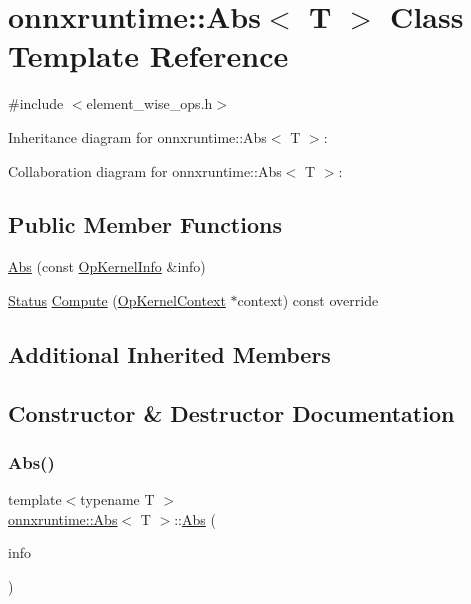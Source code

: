 \hypertarget{classonnxruntime_1_1Abs}{}\section{onnxruntime\+:\+:Abs$<$ T $>$ Class Template Reference}
\label{classonnxruntime_1_1Abs}


{\ttfamily \#include $<$element\+\_\+wise\+\_\+ops.\+h$>$}



Inheritance diagram for onnxruntime\+:\+:Abs$<$ T $>$\+:


Collaboration diagram for onnxruntime\+:\+:Abs$<$ T $>$\+:
\subsection*{Public Member Functions}
\begin{DoxyCompactItemize}
\item 
\mbox{\hyperlink{classonnxruntime_1_1Abs_aad0d44b281603d31780b0be2c7b05e5c}{Abs}} (const \mbox{\hyperlink{classonnxruntime_1_1OpKernelInfo}{Op\+Kernel\+Info}} \&info)
\item 
\mbox{\hyperlink{classonnxruntime_1_1common_1_1Status}{Status}} \mbox{\hyperlink{classonnxruntime_1_1Abs_ada4b4f47bbdd82a1e6e5180636c3e7a3}{Compute}} (\mbox{\hyperlink{classonnxruntime_1_1OpKernelContext}{Op\+Kernel\+Context}} $\ast$context) const override
\end{DoxyCompactItemize}
\subsection*{Additional Inherited Members}


\subsection{Constructor \& Destructor Documentation}
\mbox{\label{classonnxruntime_1_1Abs_aad0d44b281603d31780b0be2c7b05e5c}} 
\subsubsection{\texorpdfstring{Abs()}{Abs()}}
{\footnotesize\ttfamily template$<$typename T $>$ \\
\mbox{\hyperlink{classonnxruntime_1_1Abs}{onnxruntime\+::\+Abs}}$<$ T $>$\+::\mbox{\hyperlink{classonnxruntime_1_1Abs}{Abs}} (\begin{DoxyParamCaption}\item[{const \mbox{\hyperlink{classonnxruntime_1_1OpKernelInfo}{Op\+Kernel\+Info}} \&}]{info }\end{DoxyParamCaption})\hspace{0.3cm}{\ttfamily [inline]}}



